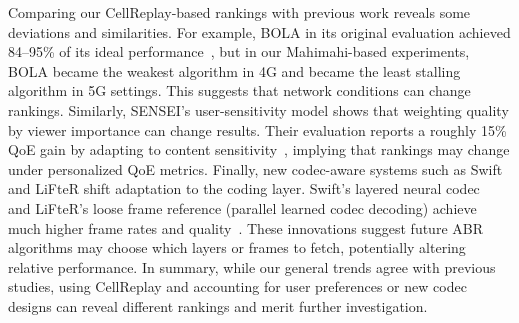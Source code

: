 Comparing our CellReplay‐based rankings with previous work reveals some deviations and similarities. For example, BOLA in its original evaluation achieved 84–95\% of its ideal performance~\cite{bola-bola}, but in our Mahimahi-based experiments, BOLA became the weakest algorithm in 4G and became the least stalling algorithm in 5G settings. This suggests that network conditions can change rankings. Similarly, SENSEI’s user-sensitivity model shows that weighting quality by viewer importance can change results. Their evaluation reports a roughly 15\% QoE gain by adapting to content sensitivity~\cite{sensei-nsdi21}, implying that rankings may change under personalized QoE metrics. Finally, new codec-aware systems such as Swift and LiFteR shift adaptation to the coding layer. Swift’s layered neural codec~\cite{swift-nsdi22} and LiFteR's loose frame reference (parallel learned codec decoding) achieve much higher frame rates and quality~\cite{lifter-nsdi24}. These innovations suggest future ABR algorithms may choose which layers or frames to fetch, potentially altering relative performance. In summary, while our general trends agree with previous studies, using CellReplay and accounting for user preferences or new codec designs can reveal different rankings and merit further investigation.

